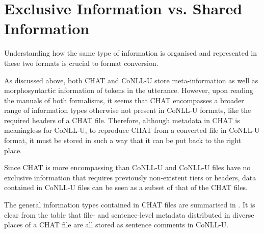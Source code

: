 
\section{Exclusive Information vs. Shared Information}
Understanding how the same type of information is organised and represented in these two formats is crucial to format conversion.

As discussed above, both CHAT and CoNLL-U store meta-information as well as morphosyntactic information of tokens in the utterance. However, upon reading the manuals of both formalisms, it seems that CHAT encompasses a broader range of information types otherwise not present in CoNLL-U formats, like the required headers of a CHAT file. Therefore, although metadata in CHAT is meaningless for CoNLL-U, to reproduce CHAT from a converted file in CoNLL-U format, it must be stored in such a way that it can be put back to the right place.

Since CHAT is more encompassing than CoNLL-U and CoNLL-U files have no exclusive information that requires previously non-existent tiers or headers, data contained in CoNLL-U files can be seen as a subset of that of the CHAT files.

The general information types contained in CHAT files are summarised in . It is clear from the table that file- and sentence-level metadata distributed in diverse places of a CHAT file are all stored as sentence comments in CoNLL-U.
\clearpage

